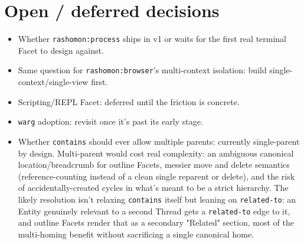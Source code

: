 \documentclass[11pt]{article}
\begin{document}
\section{Open / deferred decisions}
\label{sec:org9a0b4e0}

\begin{itemize}
\item Whether \texttt{rashomon:process} ships in v1 or waits for the first real terminal Facet to design against.
\item Same question for \texttt{rashomon:browser}'s multi-context isolation: build single-context/single-view first.
\item Scripting/REPL Facet: deferred until the friction is concrete.
\item \texttt{warg} adoption: revisit once it's past its early stage.
\item Whether \texttt{contains} should ever allow multiple parents: currently single-parent by design. Multi-parent would cost real complexity: an ambiguous canonical location/breadcrumb for outline Facets, messier move and delete semantics (reference-counting instead of a clean single reparent or delete), and the risk of accidentally-created cycles in what's meant to be a strict hierarchy. The likely resolution isn't relaxing \texttt{contains} itself but leaning on \texttt{related-to}: an Entity genuinely relevant to a second Thread gets a \texttt{related-to} edge to it, and outline Facets render that as a secondary "Related" section, most of the multi-homing benefit without sacrificing a single canonical home.
\end{itemize}
\end{document}
